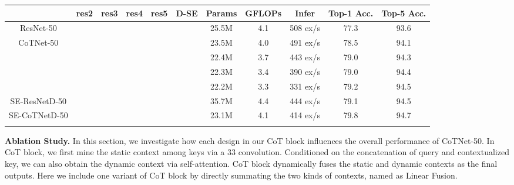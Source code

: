 \documentclass[10pt,twocolumn,letterpaper]{article}
\begin{document}
\begin{table*}[!tb]\small
  \centering
  \caption{Effect of utilizing different replacement settings on the four stages (\textbf{res2}\textbf{res3}\textbf{res4}\textbf{res5}) in the basic backbone of ResNet-50 and two widely adopted architecture changes, ResNet-D \cite{he2019bag} and Squeeze-and-Excitation \cite{hu2018squeeze} (\textbf{D-SE}).  denotes the stage is replaced with our CoT blocks.  denotes the use of architecture changes (D-SE). We adopt the default setup for training on ImageNet.}
  \setlength{\tabcolsep}{3.8pt}
\begin{tabular}{c|ccccc|c|c|c|c|c}
\Xhline{2\arrayrulewidth}
               & res2         & res3         & res4          & res5          & D-SE          & Params & GFLOPs & Infer  & Top-1 Acc. & Top-5 Acc.   \\ \hline
  ResNet-50    &              &              &               &               &               & 25.5M  & 4.1    & 508 ex/s  & 77.3       & 93.6     \\ \hline
  \multirow{4}{*}{CoTNet-50}
               &              &              &               &   &               & 23.5M  & 4.0    & 491 ex/s  & 78.5       & 94.1         \\
               &              &              &   &   &               & 22.4M  & 3.7    & 443 ex/s  & 79.0       & 94.3         \\
               &              &  &   &   &               & 22.3M  & 3.4    & 390 ex/s  & 79.0       & 94.4         \\
               &  &  &   &   &               & 22.2M  & 3.3    & 331 ex/s  & 79.2       & 94.5 \\\hline
  SE-ResNetD-50 &             &              &               &               &        & 35.7M  & 4.4    & 444 ex/s  & 79.1       & 94.5          \\
  SE-CoTNetD-50 &             &              &   &   &        & 23.1M  & 4.1    & 414 ex/s  & 79.8       & 94.7          \\
\Xhline{2\arrayrulewidth}
\end{tabular}
\vspace{-0.22in}
\label{table:rs}
\end{table*}

\textbf{Ablation Study.}
In this section, we investigate how each design in our CoT block influences the overall performance of CoTNet-50. In CoT block, we first mine the static context among keys via a 33 convolution. Conditioned on the concatenation of query and contextualized key, we can also obtain the dynamic context via self-attention. CoT block dynamically fuses the static and dynamic contexts as the final outputs. Here we include one variant of CoT block by directly summating the two kinds of contexts, named as Linear Fusion.
\end{document}
